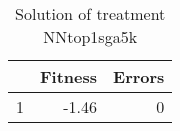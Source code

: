 \begin{table}[ht]
\centering
\begin{tabular}{rrr}
  \hline
 & Fitness & Errors \\ 
  \hline
1 & -1.46 &   0 \\ 
   \hline
\end{tabular}
\caption{Solution of treatment NNtop1sga5k} 
\end{table}
